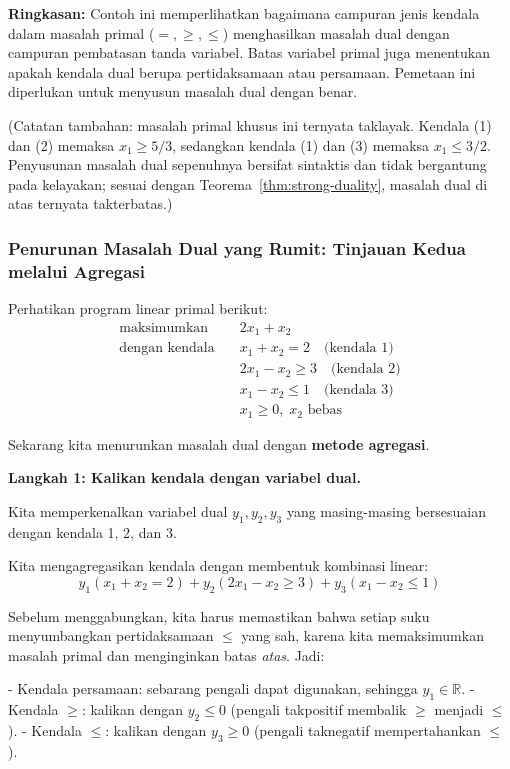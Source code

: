 \textbf{Ringkasan:}
Contoh ini memperlihatkan bagaimana campuran jenis kendala dalam masalah primal (\( =, \geq, \leq \)) menghasilkan masalah dual dengan campuran pembatasan tanda variabel. Batas variabel primal juga menentukan apakah kendala dual berupa pertidaksamaan atau persamaan. Pemetaan ini diperlukan untuk menyusun masalah dual dengan benar.

(Catatan tambahan: masalah primal khusus ini ternyata taklayak. Kendala (1) dan (2) memaksa \( x_1 \geq 5/3 \), sedangkan kendala (1) dan (3) memaksa \( x_1 \leq 3/2 \). Penyusunan masalah dual sepenuhnya bersifat sintaktis dan tidak bergantung pada kelayakan; sesuai dengan Teorema~\ref{thm:strong-duality}, masalah dual di atas ternyata takterbatas.)

\subsubsection*{Penurunan Masalah Dual yang Rumit: Tinjauan Kedua melalui Agregasi}
{}\label{example:complicated-dual-aggregation}
Perhatikan program linear primal berikut:
\[
\begin{aligned}
\text{maksimumkan} \quad & 2x_1 + x_2 \\
\text{dengan kendala} \quad
& x_1 + x_2 = 2 \quad \text{(kendala 1)} \\
& 2x_1 - x_2 \geq 3 \quad \text{(kendala 2)} \\
& x_1 - x_2 \leq 1 \quad \text{(kendala 3)} \\
& x_1 \geq 0, \; x_2 \text{ bebas}
\end{aligned}
\]

Sekarang kita menurunkan masalah dual dengan \textbf{metode agregasi}.

\vspace{0.5em}
\textbf{Langkah 1: Kalikan kendala dengan variabel dual.}

Kita memperkenalkan variabel dual \( y_1, y_2, y_3 \) yang masing-masing bersesuaian dengan kendala 1, 2, dan 3.

Kita mengagregasikan kendala dengan membentuk kombinasi linear:
\[
y_1(x_1 + x_2 = 2) + y_2(2x_1 - x_2 \geq 3) + y_3(x_1 - x_2 \leq 1)
\]

Sebelum menggabungkan, kita harus memastikan bahwa setiap suku menyumbangkan pertidaksamaan \( \leq \) yang sah, karena kita memaksimumkan masalah primal dan menginginkan batas \emph{atas}. Jadi:

- Kendala persamaan: sebarang pengali dapat digunakan, sehingga \( y_1 \in \mathbb{R} \).
- Kendala \( \geq \): kalikan dengan \( y_2 \leq 0 \) (pengali takpositif membalik \( \geq \) menjadi \( \leq \)).
- Kendala \( \leq \): kalikan dengan \( y_3 \geq 0 \) (pengali taknegatif mempertahankan \( \leq \)).

